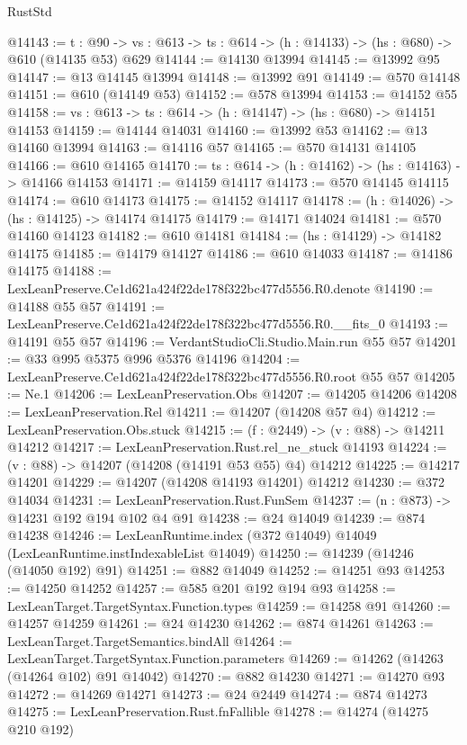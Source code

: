 \begin{lexlean}{RustStd}
\begin{coremodule}
@14143 := {t : @90} ->
  {vs : @613} -> {ts : @614} -> (h : @14133) -> (hs : @680) -> @610 (@14135 @53) @629
@14144 := @14130 @13994
@14145 := @13992 @95
@14147 := @13 @14145 @13994
@14148 := @13992 @91
@14149 := @570 @14148
@14151 := @610 (@14149 @53)
@14152 := @578 @13994
@14153 := @14152 @55
@14158 := {vs : @613} -> {ts : @614} -> (h : @14147) -> (hs : @680) -> @14151 @14153
@14159 := @14144 @14031
@14160 := @13992 @53
@14162 := @13 @14160 @13994
@14163 := @14116 @57
@14165 := @570 @14131 @14105
@14166 := @610 @14165
@14170 := {ts : @614} -> (h : @14162) -> (hs : @14163) -> @14166 @14153
@14171 := @14159 @14117
@14173 := @570 @14145 @14115
@14174 := @610 @14173
@14175 := @14152 @14117
@14178 := (h : @14026) -> (hs : @14125) -> @14174 @14175
@14179 := @14171 @14024
@14181 := @570 @14160 @14123
@14182 := @610 @14181
@14184 := (hs : @14129) -> @14182 @14175
@14185 := @14179 @14127
@14186 := @610 @14033
@14187 := @14186 @14175
@14188 := LexLeanPreserve.Ce1d621a424f22de178f322bc477d5556.R0.denote
@14190 := @14188 @55 @57
@14191 := LexLeanPreserve.Ce1d621a424f22de178f322bc477d5556.R0.__fits_0
@14193 := @14191 @55 @57
@14196 := VerdantStudioCli.Studio.Main.run @55 @57
@14201 := @33 @995 @5375 @996 @5376 @14196
@14204 := LexLeanPreserve.Ce1d621a424f22de178f322bc477d5556.R0.root @55 @57
@14205 := Ne.{1}
@14206 := LexLeanPreservation.Obs
@14207 := @14205 @14206
@14208 := LexLeanPreservation.Rel
@14211 := @14207 (@14208 @57 @4)
@14212 := LexLeanPreservation.Obs.stuck
@14215 := (f : @2449) -> (v : @88) -> @14211 @14212
@14217 := LexLeanPreservation.Rust.rel_ne_stuck @14193
@14224 := (v : @88) -> @14207 (@14208 (@14191 @53 @55) @4) @14212
@14225 := @14217 @14201
@14229 := @14207 (@14208 @14193 @14201) @14212
@14230 := @372 @14034
@14231 := LexLeanPreservation.Rust.FunSem
@14237 := (n : @873) -> @14231 @192 @194 @102 @4 @91
@14238 := @24 @14049
@14239 := @874 @14238
@14246 := LexLeanRuntime.index (@372 @14049) @14049 (LexLeanRuntime.instIndexableList @14049)
@14250 := @14239 (@14246 (@14050 @192) @91)
@14251 := @882 @14049
@14252 := @14251 @93
@14253 := @14250 @14252
@14257 := @585 @201 @192 @194 @93
@14258 := LexLeanTarget.TargetSyntax.Function.types
@14259 := @14258 @91
@14260 := @14257 @14259
@14261 := @24 @14230
@14262 := @874 @14261
@14263 := LexLeanTarget.TargetSemantics.bindAll
@14264 := LexLeanTarget.TargetSyntax.Function.parameters
@14269 := @14262 (@14263 (@14264 @102) @91 @14042)
@14270 := @882 @14230
@14271 := @14270 @93
@14272 := @14269 @14271
@14273 := @24 @2449
@14274 := @874 @14273
@14275 := LexLeanPreservation.Rust.fnFallible
@14278 := @14274 (@14275 @210 @192)

\end{coremodule}
\end{lexlean}

